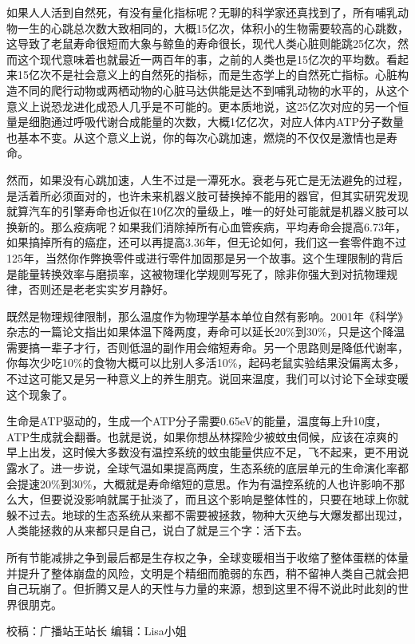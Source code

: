 \documentclass[
]{book}
\begin{document}
如果人人活到自然死，有没有量化指标呢？无聊的科学家还真找到了，所有哺乳动物一生的心跳总次数大致相同的，大概15亿次，体积小的生物需要较高的心跳数，这导致了老鼠寿命很短而大象与鲸鱼的寿命很长，现代人类心脏则能跳25亿次，然而这个现代意味着也就最近一两百年的事，之前的人类也是15亿次的平均数。看起来15亿次不是社会意义上的自然死的指标，而是生态学上的自然死亡指标。心脏构造不同的爬行动物或两栖动物的心脏马达供能是达不到哺乳动物的水平的，从这个意义上说恐龙进化成恐人几乎是不可能的。更本质地说，这25亿次对应的另一个恒量是细胞通过呼吸代谢合成能量的次数，大概1亿亿次，对应人体内ATP分子数量也基本不变。从这个意义上说，你的每次心跳加速，燃烧的不仅仅是激情也是寿命。

然而，如果没有心跳加速，人生不过是一潭死水。衰老与死亡是无法避免的过程，是活着所必须面对的，也许未来机器义肢可替换掉不能用的器官，但其实研究发现就算汽车的引擎寿命也近似在10亿次的量级上，唯一的好处可能就是机器义肢可以换新的。那么疫病呢？如果我们消除掉所有心血管疾病，平均寿命会提高6.73年，如果搞掉所有的癌症，还可以再提高3.36年，但无论如何，我们这一套零件跑不过125年，当然你作弊换零件或进行零件加固那是另一个故事。这个生理限制的背后是能量转换效率与磨损率，这被物理化学规则写死了，除非你强大到对抗物理规律，否则还是老老实实岁月静好。

既然是物理规律限制，那么温度作为物理学基本单位自然有影响。2001年《科学》杂志的一篇论文指出如果体温下降两度，寿命可以延长20\%到30\%，只是这个降温需要搞一辈子才行，否则低温的副作用会缩短寿命。另一个思路则是降低代谢率，你每次少吃10\%的食物大概可以比别人多活10\%，起码老鼠实验结果没偏离太多，不过这可能又是另一种意义上的养生朋克。说回来温度，我们可以讨论下全球变暖这个现象了。

生命是ATP驱动的，生成一个ATP分子需要0.65eV的能量，温度每上升10度，ATP生成就会翻番。也就是说，如果你想丛林探险少被蚊虫伺候，应该在凉爽的早上出发，这时候大多数没有温控系统的蚊虫能量供应不足，飞不起来，更不用说露水了。进一步说，全球气温如果提高两度，生态系统的底层单元的生命演化率都会提速20\%到30\%，大概就是寿命缩短的意思。作为有温控系统的人也许影响不那么大，但要说没影响就属于扯淡了，而且这个影响是整体性的，只要在地球上你就躲不过去。地球的生态系统从来都不需要被拯救，物种大灭绝与大爆发都出现过，人类能拯救的从来都只是自己，说白了就是三个字：活下去。

所有节能减排之争到最后都是生存权之争，全球变暖相当于收缩了整体蛋糕的体量并提升了整体崩盘的风险，文明是个精细而脆弱的东西，稍不留神人类自己就会把自己玩崩了。但折腾又是人的天性与力量的来源，想到这里不得不说此时此刻的世界很朋克。

校稿：广播站王站长
编辑：Lisa小姐
\end{document}
